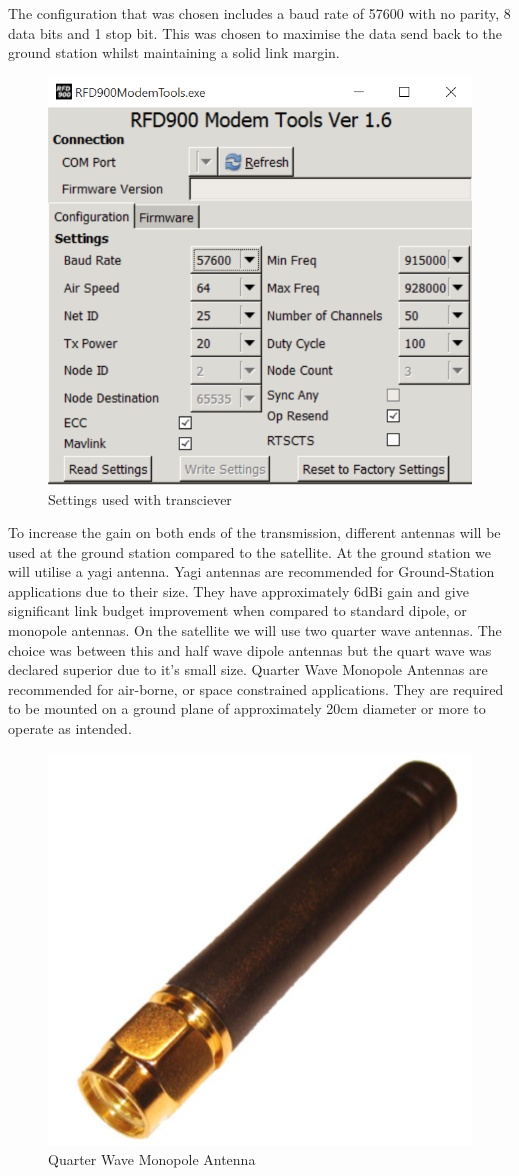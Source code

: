 \noindent
The configuration that was chosen includes a baud rate of 57600 with no parity, 8 data bits and 1 stop bit. This was chosen to maximise the data send back to the ground station whilst maintaining a solid link margin.
\begin{figure}[H]
    \centering
    \includegraphics[width=0.75\linewidth]{./figures/rfd2}
    \caption{Settings used with transciever}
\end{figure}
To increase the gain on both ends of the transmission, different antennas will be used at the ground station compared to the satellite. At the ground station we will utilise a yagi antenna. Yagi antennas are recommended for Ground-Station applications due to their size. They have approximately 6dBi gain and give significant link budget improvement when compared to standard dipole, or monopole antennas. 
\noindent
On the satellite we will use two quarter wave antennas. The choice was between this and half wave dipole antennas but the quart wave was declared superior due to it’s small size. Quarter Wave Monopole Antennas are recommended for air-borne, or space constrained applications. They are required to be mounted on a ground plane of approximately 20cm diameter or more to operate as intended.
\begin{figure}[H]
    \centering
    \includegraphics[width=0.6\linewidth]{./figures/antennae}
    \caption{Quarter Wave Monopole Antenna}
\end{figure}
